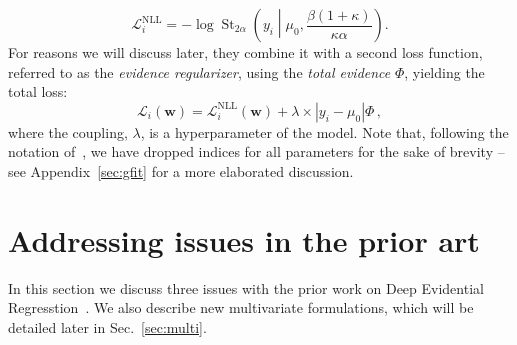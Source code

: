 \documentclass{article}
\begin{document}
\begin{equation}
    \mathcal{L}_i^\text{NLL} = -\log \operatorname{St}_{2\alpha}\!\left( y_i \middle| \mu_0, \frac{\beta(1 + \kappa)}{\kappa \alpha} \right).
\end{equation}
For reasons we will discuss later, they combine it with a second loss function, referred to as the \textit{evidence regularizer}, using the \textit{total evidence} $\Phi$, yielding the total loss:
\begin{equation}
    \mathcal{L}_i(\bm{w}) = \mathcal{L}_i^\text{NLL}(\bm{w}) + \lambda \times |y_i - \mu_0| \Phi \,,
\end{equation}
where the coupling, $\lambda$, is a hyperparameter of the model.
Note that, following the notation of~\cite{amini20}, we have dropped indices for all parameters for the sake of brevity -- see Appendix~\ref{sec:gfit} for a more elaborated discussion.

\section{Addressing issues in the prior art}
\label{sec:issues}
In this section we discuss three issues with the prior work on Deep Evidential Regresstion~\cite{amini20}.
We also describe new multivariate formulations,  which will be detailed later in Sec.~\ref{sec:multi}.
\end{document}
